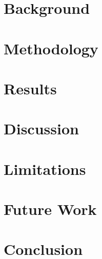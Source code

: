 \documentclass[12pt]{article}
\begin{document}
\section{Background}


\section{Methodology}




\section{Results}



\section{Discussion}


\section{Limitations}


\section{Future Work}


\section{Conclusion}




\end{document}
